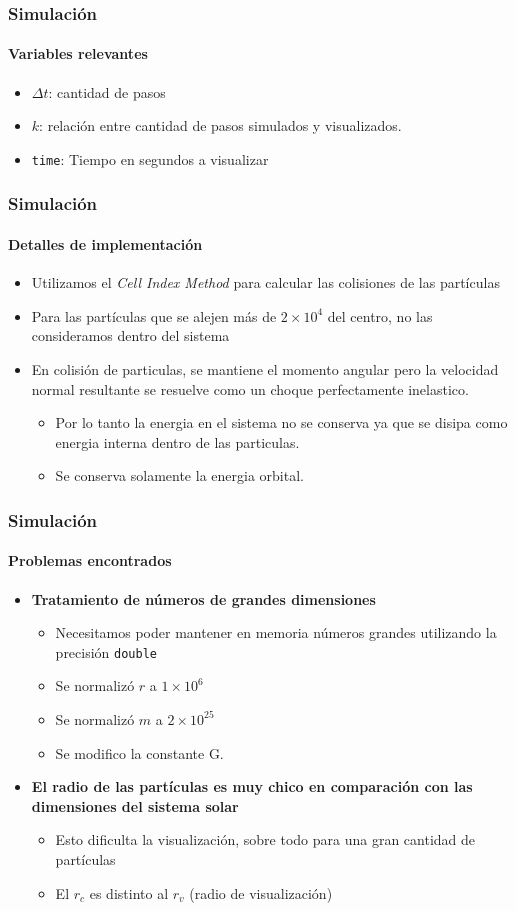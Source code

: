 \documentclass[hyperref={pdfpagelayout=SinglePage}]{beamer}
\begin{document}
\begin{frame}
\frametitle{Simulación}
\framesubtitle{Variables relevantes}
\begin{itemize}
	\item $\Delta t$: cantidad de pasos
	\item $k$: relación entre cantidad de pasos simulados y visualizados.
	\item \texttt{time}: Tiempo en segundos a visualizar
\end{itemize}
\end{frame}

\begin{frame}
\frametitle{Simulación}
\framesubtitle{Detalles de implementación}
\begin{itemize}
	\item Utilizamos el \textit{Cell Index Method} para calcular las colisiones de las partículas
	\item Para las partículas que se alejen más de $2 \times 10^{4}$ del centro, no las consideramos dentro del sistema
	\item En colisión de particulas, se mantiene el momento angular pero la velocidad normal resultante se resuelve como un choque perfectamente inelastico.
	\begin{itemize}
		\item Por lo tanto la energia en el sistema no se conserva ya que se disipa como energia interna dentro de las particulas.
		\item Se conserva solamente la energia orbital.
	\end{itemize}
\end{itemize}
\end{frame}

\begin{frame}
\frametitle{Simulación}
\framesubtitle{Problemas encontrados}
\begin{itemize}
	\item \textbf{Tratamiento de números de grandes dimensiones}
	\begin{itemize}
		\item Necesitamos poder mantener en memoria números grandes utilizando la precisión \texttt{double}
		\item Se normalizó $r$ a $1 \times 10^{6}$
		\item Se normalizó $m$ a $2 \times 10^{25}$
		\item Se modifico la constante G.
	\end{itemize}
	\item \textbf{El radio de las partículas es muy chico en comparación con las dimensiones del sistema solar}
	\begin{itemize}
			\item Esto dificulta la visualización, sobre todo para una gran cantidad de partículas
			\item El $r_{c}$ es distinto al $r_{v}$ (radio de visualización)
	\end{itemize}
\end{itemize}
\end{frame}
\end{document}

